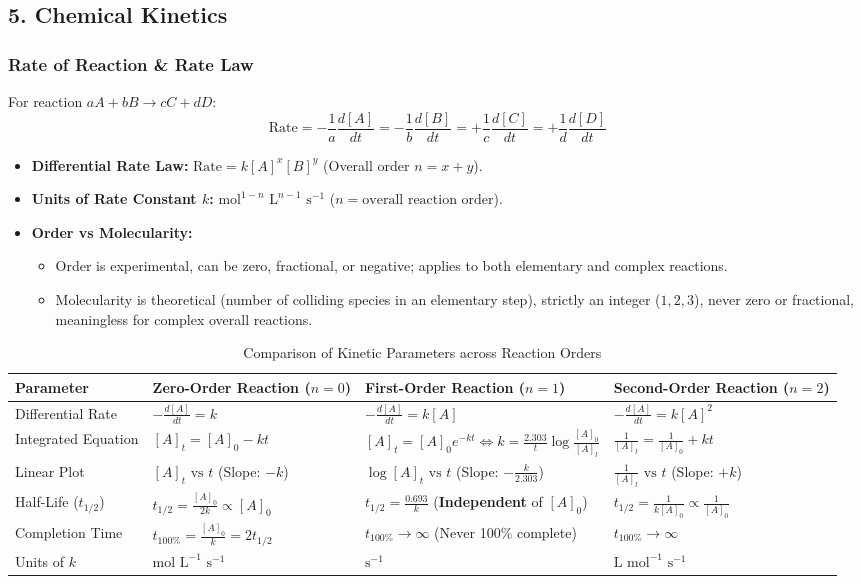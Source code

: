 \documentclass[11pt,a4paper]{article}
\begin{document}
\subsection{5. Chemical Kinetics}

\subsubsection{Rate of Reaction \& Rate Law}
For reaction $aA + bB \to cC + dD$:
\[
  \text{Rate} = -\frac{1}{a}\frac{d[A]}{dt} = -\frac{1}{b}\frac{d[B]}{dt} = +\frac{1}{c}\frac{d[C]}{dt} = +\frac{1}{d}\frac{d[D]}{dt}
\]
\begin{itemize}[leftmargin=1.5em, itemsep=2pt]
  \item \textbf{Differential Rate Law:} $\text{Rate} = k [A]^x [B]^y$ (Overall order $n = x + y$).
  \item \textbf{Units of Rate Constant $k$:} $\text{mol}^{1-n} \text{ L}^{n-1} \text{ s}^{-1}$ ($n = \text{overall reaction order}$).
  \item \textbf{Order vs Molecularity:}
  \begin{itemize}[label=$\circ$]
    \item Order is experimental, can be zero, fractional, or negative; applies to both elementary and complex reactions.
    \item Molecularity is theoretical (number of colliding species in an elementary step), strictly an integer ($1, 2, 3$), never zero or fractional, meaningless for complex overall reactions.
  \end{itemize}
\end{itemize}

\begin{table}[h]
\centering
\small
\begin{tabularx}{\textwidth}{l X X X}
\toprule
\textbf{Parameter} & \textbf{Zero-Order Reaction ($n=0$)} & \textbf{First-Order Reaction ($n=1$)} & \textbf{Second-Order Reaction ($n=2$)} \\
\midrule
Differential Rate & $-\frac{d[A]}{dt} = k$ & $-\frac{d[A]}{dt} = k[A]$ & $-\frac{d[A]}{dt} = k[A]^2$ \\
Integrated Equation & $[A]_t = [A]_0 - kt$ & $[A]_t = [A]_0 e^{-kt} \iff k = \frac{2.303}{t}\log\frac{[A]_0}{[A]_t}$ & $\frac{1}{[A]_t} = \frac{1}{[A]_0} + kt$ \\
Linear Plot & $[A]_t \text{ vs } t$ (Slope: $-k$) & $\log[A]_t \text{ vs } t$ (Slope: $-\frac{k}{2.303}$) & $\frac{1}{[A]_t} \text{ vs } t$ (Slope: $+k$) \\
Half-Life ($t_{1/2}$) & $t_{1/2} = \frac{[A]_0}{2k} \propto [A]_0$ & $t_{1/2} = \frac{0.693}{k}$ (\textbf{Independent} of $[A]_0$) & $t_{1/2} = \frac{1}{k[A]_0} \propto \frac{1}{[A]_0}$ \\
Completion Time & $t_{100\%} = \frac{[A]_0}{k} = 2 t_{1/2}$ & $t_{100\%} \to \infty$ (Never 100\% complete) & $t_{100\%} \to \infty$ \\
Units of $k$ & $\text{mol L}^{-1} \text{ s}^{-1}$ & $\text{s}^{-1}$ & $\text{L mol}^{-1} \text{ s}^{-1}$ \\
\bottomrule
\end{tabularx}
\caption{Comparison of Kinetic Parameters across Reaction Orders}
\end{table}
\end{document}
